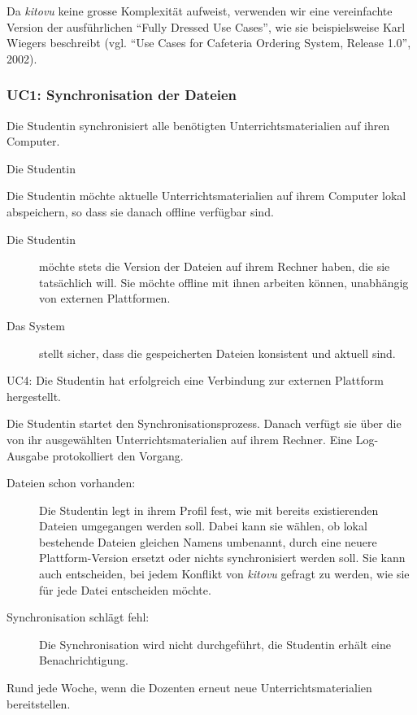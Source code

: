 \documentclass[a4paper]{article}
\begin{document}
Da \emph{kitovu} keine grosse Komplexität aufweist, verwenden wir eine vereinfachte Version der ausführ\-lichen ``Fully Dressed Use Cases'', wie sie beispielsweise Karl Wiegers beschreibt (vgl. ``Use Cases for Cafeteria Ordering System, Release 1.0'', 2002).


\subsubsection{UC1: Synchronisation der Dateien}

\begin{description}[uclist]
	\item[Goal] Die Studentin synchronisiert alle benötigten Unterrichtsmaterialien auf ihren Computer.
	\item[Primary Actor] Die Studentin
	\item[Trigger] Die Studentin möchte aktuelle Unterrichtsmaterialien auf ihrem Computer lokal abspeichern, so dass sie danach offline verfügbar sind.
	\item[Stakeholders and Interests]
	\begin{description}
		\item[Die Studentin] möchte stets die Version der Dateien auf ihrem Rechner haben, die sie tatsächlich will. Sie möchte offline mit ihnen arbeiten können, unabhängig von externen Plattformen.
		\item[Das System] stellt sicher, dass die gespeicherten Dateien konsistent und aktuell sind.
	\end{description}
	\item[Preconditions] UC4: Die Studentin hat erfolgreich eine Verbindung zur externen Plattform hergestellt.
	\item[Main Success Scenario] Die Studentin startet den Synchronisationsprozess. Danach verfügt sie über die von ihr ausgewählten Unterrichtsmaterialien auf ihrem Rechner. Eine Log-Ausgabe protokolliert den Vorgang.
	\item[Extensions]
	\begin{description}
		\item[Dateien schon vorhanden:] Die Studentin legt in ihrem Profil fest, wie mit bereits existierenden Dateien umgegangen werden soll. Dabei kann sie wählen, ob lokal bestehende Dateien gleichen Namens umbenannt, durch eine neuere Plattform-Version ersetzt oder nichts synchronisiert werden soll. Sie kann auch entscheiden, bei jedem Konflikt von \emph{kitovu} gefragt zu werden, wie sie für jede Datei entscheiden möchte.
		\item[Synchronisation schlägt fehl:] Die Synchronisation wird nicht durchgeführt, die Studentin erhält eine Benachrichtigung.
	\end{description}
	\item[Frequency of Occurrence] Rund jede Woche, wenn die Dozenten erneut neue Unterrichtsmaterialien bereitstellen.
\end{description}
\end{document}
